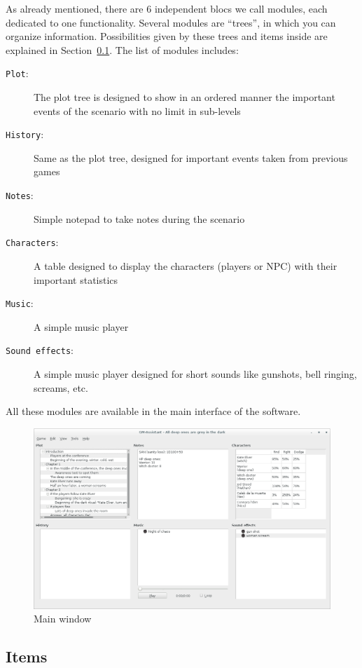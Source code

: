 \documentclass[a4paper,12pt]{article}
\newcommand*{\interfaceitem}[1]{\texttt{#1}}
\begin{document}
As already mentioned, there are 6 independent blocs we call modules, each dedicated to one functionality. Several modules are ``trees'', in which you can organize information. Possibilities given by these trees and items inside are explained in Section~\ref{item}.
The list of modules includes:
\begin{description}
    \item[\interfaceitem{Plot}:]{The plot tree is designed to show in an ordered manner the important events of the scenario with no limit in sub-levels}
    \item[\interfaceitem{History}:]{Same as the plot tree, designed for important events taken from previous games}
    \item[\interfaceitem{Notes}:]{Simple notepad to take notes during the scenario}
    \item[\interfaceitem{Characters}:]{A table designed to display the characters (players or NPC) with their important statistics}
    \item[\interfaceitem{Music}:]{A simple music player}
    \item[\interfaceitem{Sound effects}:]{A simple music player designed for short sounds like gunshots, bell ringing, screams, etc.}
\end{description}
All these modules are available in the main interface of the software.
\begin{figure}[ht]
    \centerline{\includegraphics[width=\textwidth]{full_scenario}}
    \caption{Main window}
    \label{fig:interface}
\end{figure}

\subsection{Items}
\label{item}
\end{document}
